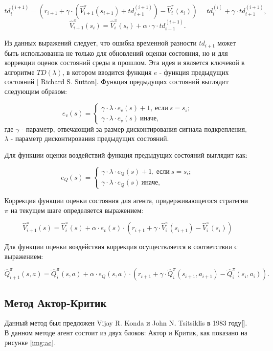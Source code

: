 $$
td^{(i+1)}_{i} = (r_{i+1} + \gamma\cdot(\hat{V}^{\pi}_{i+1}(s_{i+1}) + td^{(i+1)}_{i+1})-\hat{V}^{\pi}_{i}(s_{i})) = td^{(i)}_{i} + \gamma\cdot td^{(i+1)}_{i+1},
$$
$$
\hat{V}^{\pi}_{i+1}(s_{i}) = \hat{V}^{\pi}_{i}(s_{i}) + \alpha\cdot\gamma\cdot td^{(i+1)}_{i+1}.
$$

Из данных выражений следует, что ошибка временной разности $ td_{i+1} $ может быть использованна не только для обновлений оценки состояния, но и для коррекции оценок состояний среды в прошлом. Эта идея и является ключевой в алгоритме $TD(\lambda)$, в котором вводится функция $ e $ - функция предыдущих состояний [ Richard S. Sutton]. Функция предыдущих состояний выглядит следующим образом:

$$
 e_v(s) = 
 \begin{cases}
  \gamma\cdot\lambda\cdot e_v(s)+1, \: \text{если} \: s=s_i; \\
  \gamma\cdot\lambda\cdot e_v(s) \: \text{иначе},
 \end{cases}
$$
где $ \gamma $ - параметр, отвечающий за размер дисконтирования сигнала подкрепления, $ \lambda $ - параметр дисконтирования предыдущих состояний.

Для функции оценки воздействий функция предыдущих состояний выглядит как:

$$
e_Q(s) = 
\begin{cases}
\gamma\cdot\lambda\cdot e_Q(s)+1, \: \text{если} \: s=s_i; \\
\gamma\cdot\lambda\cdot e_Q(s) \: \text{иначе},
\end{cases}
$$

Коррекция функции оценки состояния для агента, придерживающегося стратегии $ \pi $ на текущем шаге определяется выражением:

$$
\hat{V}^{\pi}_{i+1}(s) = \hat{V}^{\pi}_{i}(s) + \alpha\cdot e_v(s)\cdot(r_{i+1} + \gamma\cdot\hat{V}^{\pi}_{i}(s_{i+1})-\hat{V}^{\pi}_{i}(s_{i}))
$$

Для функции оценки воздействия коррекция осуществляется в соответствии с выражением:

$$
\hat{Q}^{\pi}_{i+1}(s, a) = \hat{Q}^{\pi}_{i}(s, a) + \alpha\cdot e_Q(s, a)\cdot(r_{i+1} + \gamma\cdot\hat{Q}^{\pi}_{i}(s_{i+1}, a_{i+1})-\hat{Q}^{\pi}_{i}(s_{i}, a_{i})).
$$

\subsection{Метод Актор-Критик} \label{subsect1_6_5}
Данный метод был предложен Vijay R. Konda и John N. Tsitsiklis в 1983 году[]. В данном методе агент состоит из двух блоков: Актор и Критик, как показано на рисунке \ref{img:ac}.

